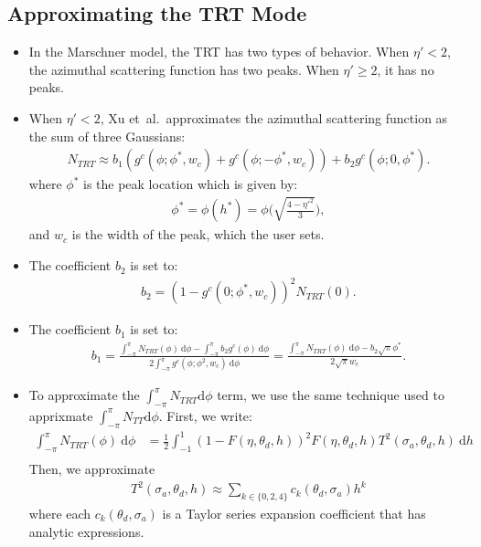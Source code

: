 \documentclass[10pt]{article}
\newcommand{\dee}{\mathrm{d}}
\newcommand{\etal}{{et~al.}}
\begin{document}
  \subsection{Approximating the TRT Mode}
  \begin{itemize}
    \item In the Marschner model, the TRT has two types of behavior. When $\eta' < 2$, the azimuthal scattering function has two peaks. When $\eta' \geq 2$, it has no peaks.
    
    \item When $\eta' < 2$, Xu \etal~approximates the azimuthal scattering function as the sum of three Gaussians:
    \begin{align*}
      N_{TRT} \approx b_1( g^c(\phi; \phi^*, w_c) + g^c(\phi; -\phi^*, w_c) ) + b_2 g^c(\phi; 0, \phi^*).
    \end{align*}
    where $\phi^*$ is the peak location which is given by:
    \begin{align*}
      \phi^* = \phi(h^*) = \phi\bigg( \sqrt{ \frac{4-\eta'^2}{3} } \bigg),
    \end{align*}
    and $w_c$ is the width of the peak, which the user sets.
    
    \item The coefficient $b_2$ is set to:
    \begin{align*}
      b_2 = (1 - g^c(0;\phi^*, w_c))^2 N_{TRT}(0).
    \end{align*}
    
    \item The coefficient $b_1$ is set to:
    \begin{align*}
      b_1 = \frac{\int_{-\pi}^\pi N_{TRT}(\phi)\ \dee\phi - \int_{-\pi}^\pi b_2 g^c(\phi)\ \dee\phi }{2\int_{-\pi}^\pi g^c(\phi; \phi^2, w_c)\ \dee\phi}
      = \frac{\int_{-\pi}^\pi N_{TRT}(\phi)\ \dee\phi - b_2\sqrt{\pi}\phi^* }{2\sqrt{\pi}w_c}.
    \end{align*}
    
    \item To approximate the $\int_{-\pi}^{\pi} N_{TRT} \dee\phi$ term, we use the same technique used to apprixmate $\int_{-\pi}^{\pi} N_{TT} \dee\phi$. First, we write:
    \begin{align*}
      \int_{-\pi}^\pi N_{TRT}(\phi)\ \dee\phi
      &= \frac{1}{2} \int_{-1}^1 (1 - F(\eta, \theta_d, h))^2 F(\eta, \theta_d, h) T^2 (\sigma_a, \theta_d, h)\ \dee h\\
    \end{align*}
    Then, we approximate
    \begin{align*}
      T^2(\sigma_a, \theta_d, h) \approx \sum_{k \in \{ 0, 2, 4\}} c_k(\theta_d, \sigma_a) h^k
    \end{align*}
    where each $c_k(\theta_d, \sigma_a)$ is a Taylor series expansion coefficient that has analytic expressions.
    

\end{itemize}
\end{document}
